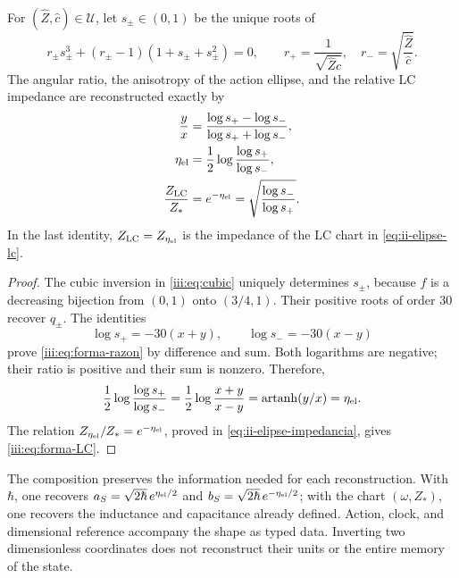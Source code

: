 \begin{proposition}
\label{iii:prop:forma-LC}
For $(\widehat Z,\widehat c)\in\mathcal U$, let $s_\pm\in(0,1)$ be the
unique roots of
\begin{equation}
 r_\pm s_\pm^3+(r_\pm-1)(1+s_\pm+s_\pm^2)=0,
 \qquad
 r_+=\frac1{\sqrt{\widehat Z\widehat c}},\quad
 r_-=\sqrt{\frac{\widehat Z}{\widehat c}}.
 \label{iii:eq:forma-inversion}
\end{equation}
The angular ratio, the anisotropy of the action ellipse, and the relative LC
impedance are reconstructed exactly by
\begin{align}
 \frac{y}{x}
 &=\frac{\log s_+-\log s_-}{\log s_++\log s_-},
 \label{iii:eq:forma-razon}\\
 \eta_{\rm el}
 &=\frac12\log\frac{\log s_+}{\log s_-},
 \label{iii:eq:forma-eta}\\
 \frac{Z_{\rm LC}}{Z_*}
 &=e^{-\eta_{\rm el}}
  =\sqrt{\frac{\log s_-}{\log s_+}}.
 \label{iii:eq:forma-LC}
\end{align}
In the last identity, $Z_{\rm LC}=Z_{\eta_{\rm el}}$ is the impedance
of the LC chart in \eqref{eq:ii-elipse-lc}.
\end{proposition}
\begin{proof}
The cubic inversion in \eqref{iii:eq:cubic} uniquely determines $s_\pm$,
because $f$ is a decreasing bijection from $(0,1)$ onto
$(3/4,1)$. Their positive roots of order $30$ recover $q_\pm$.
The identities
\[
 \log s_+=-30(x+y),\qquad \log s_-=-30(x-y)
\]
prove \eqref{iii:eq:forma-razon} by difference and sum. Both logarithms
are negative; their ratio is positive and their sum is nonzero. Therefore,
\[
 \frac12\log\frac{\log s_+}{\log s_-}
   =\frac12\log\frac{x+y}{x-y}
   =\operatorname{artanh}(y/x)=\eta_{\rm el}.
\]
The relation $Z_{\eta_{\rm el}}/Z_*=e^{-\eta_{\rm el}}$, proved in
\eqref{eq:ii-elipse-impedancia}, gives \eqref{iii:eq:forma-LC}.
\end{proof}

The composition preserves the information needed for each reconstruction.
With $\hbar$, one recovers
$a_S=\sqrt{2\hbar}\,e^{\eta_{\rm el}/2}$ and
$b_S=\sqrt{2\hbar}\,e^{-\eta_{\rm el}/2}$; with the chart
$(\omega,Z_*)$, one recovers the inductance and capacitance already defined.
Action, clock, and dimensional reference accompany the shape as
typed data. Inverting two dimensionless coordinates does not
reconstruct their units or the entire memory of the state.

